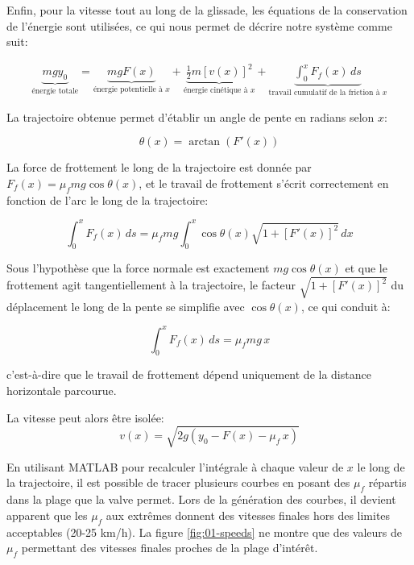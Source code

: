 Enfin, pour la vitesse tout au long de la glissade, les équations de la
conservation de l'énergie sont utilisées, ce qui nous permet de décrire notre
système comme suit:

\begin{align}
\underbrace{m g y_0}_{\textrm{énergie totale}} =
  \underbrace{m g F(x)}_{\textrm{énergie potentielle à } x} +
  \underbrace{\frac{1}{2} m [v(x)]^2}_{\textrm{énergie cinétique à } x} +
  \underbrace{\int_0^x F_f(x) \, ds}_{\textrm{travail cumulatif de la friction à } x}
\end{align}

La trajectoire obtenue permet d'établir un angle de pente en radians selon $x$:

\begin{equation}
\theta(x) = \arctan(F'(x))
\end{equation}

La force de frottement le long de la trajectoire est donnée par $F_f(x) = \mu_f
m g \cos\theta(x)$, et le travail de frottement s'écrit correctement en fonction
de l'arc le long de la trajectoire:

\begin{equation}
\int_0^x F_f(x) \, ds = \mu_f m g \int_0^x \cos\theta(x) \sqrt{1 + [F'(x)]^2} \, dx
\end{equation}

Sous l’hypothèse que la force normale est exactement $mg\cos\theta(x)$ et que le
frottement agit tangentiellement à la trajectoire, le facteur $\sqrt{1 +
[F'(x)]^2}$ du déplacement le long de la pente se simplifie avec
$\cos\theta(x)$, ce qui conduit à:

\begin{equation}
\int_0^x F_f(x) \, ds = \mu_f m g \, x
\end{equation}

c’est-à-dire que le travail de frottement dépend uniquement de la distance
horizontale parcourue.

La vitesse peut alors être isolée:
\begin{equation}
v(x) = \sqrt{2 g \left( y_0 - F(x) - \mu_f \, x \right)}
\end{equation}

En utilisant MATLAB pour recalculer l'intégrale à chaque valeur de $x$ le long
de la trajectoire, il est possible de tracer plusieurs courbes en posant des
$\mu_f$ répartis dans la plage que la valve permet. Lors de la génération des
courbes, il devient apparent que les $\mu_f$ aux extrêmes donnent des vitesses
finales hors des limites acceptables (20-25 km/h). La figure \ref{fig:01-speeds}
ne montre que des valeurs de $\mu_f$ permettant des vitesses finales proches de
la plage d'intérêt.


